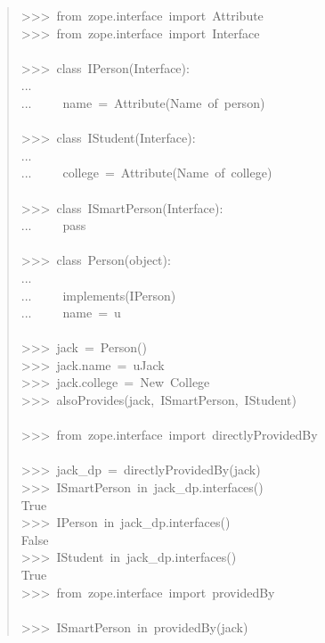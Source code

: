 \documentclass[14pt,a4paper,openany,twoside,final]{extbook}
\begin{document}
\begin{quote}{\ttfamily \raggedright \noindent
>{}>{}>~from~zope.interface~import~Attribute\\
>{}>{}>~from~zope.interface~import~Interface\\
~\\
>{}>{}>~class~IPerson(Interface):\\
...\\
...~~~~~name~=~Attribute(\textquotedbl{}Name~of~person\textquotedbl{})\\
~\\
>{}>{}>~class~IStudent(Interface):\\
...\\
...~~~~~college~=~Attribute(\textquotedbl{}Name~of~college\textquotedbl{})\\
~\\
>{}>{}>~class~ISmartPerson(Interface):\\
...~~~~~pass\\
~\\
>{}>{}>~class~Person(object):\\
...\\
...~~~~~implements(IPerson)\\
...~~~~~name~=~u\textquotedbl{}\textquotedbl{}\\
~\\
>{}>{}>~jack~=~Person()\\
>{}>{}>~jack.name~=~u\textquotedbl{}Jack\textquotedbl{}\\
>{}>{}>~jack.college~=~\textquotedbl{}New~College\textquotedbl{}\\
>{}>{}>~alsoProvides(jack,~ISmartPerson,~IStudent)\\
~\\
>{}>{}>~from~zope.interface~import~directlyProvidedBy\\
~\\
>{}>{}>~jack\_dp~=~directlyProvidedBy(jack)\\
>{}>{}>~ISmartPerson~in~jack\_dp.interfaces()\\
True\\
>{}>{}>~IPerson~in~jack\_dp.interfaces()\\
False\\
>{}>{}>~IStudent~in~jack\_dp.interfaces()\\
True\\
>{}>{}>~from~zope.interface~import~providedBy\\
~\\
>{}>{}>~ISmartPerson~in~providedBy(jack)\\
}
\end{quote}
\end{document}
